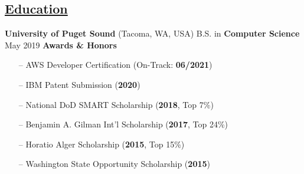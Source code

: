 \documentclass{article}
\begin{document}
\begin{multicols}{2}
\section*{\underline{Education}}
{\footnotesize{
\textbf{University of Puget Sound} (Tacoma, WA, USA)
\newline B.S. in \textbf{Computer Science}
\newline May 2019
\newline\newline\textbf{Awards \& Honors}
\begin{itemize}
	\item[--] AWS Developer Certification (On-Track: \textbf{06/2021})
	\item[--] IBM Patent Submission (\textbf{2020})
	\item[--] National DoD SMART Scholarship (\textbf{2018}, Top 7\%)
	\item[--] Benjamin A. Gilman Int'l Scholarship (\textbf{2017}, Top 24\%)
	\item[--] Horatio Alger Scholarship (\textbf{2015}, Top 15\%)
	\item[--] Washington State Opportunity Scholarship (\textbf{2015})
\end{itemize} 
}}

\hfill  \quad

\end{multicols} 
\end{document}
